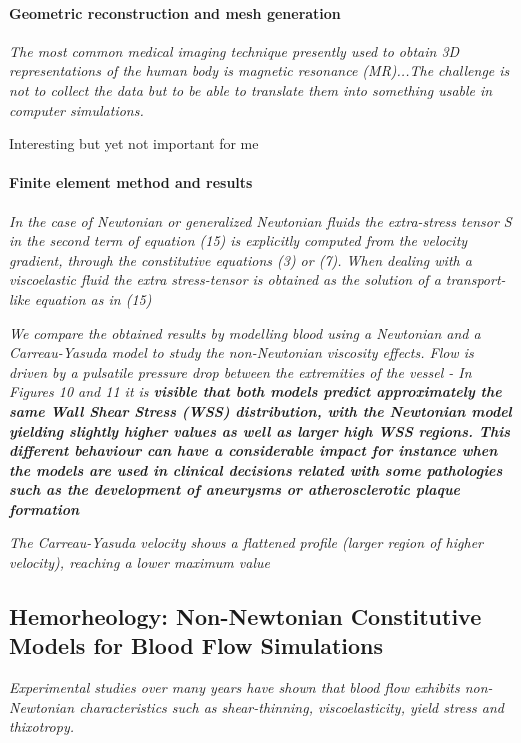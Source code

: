 \documentclass[11pt,letterpaper]{article}
\begin{document}
\paragraph{Geometric reconstruction and mesh generation}
\textit{The most common medical imaging technique presently used to obtain 3D representations of the human body is magnetic resonance (MR)...The challenge is not to collect the data but to be able to translate them into something usable in computer simulations.}

Interesting but yet not important for me


\paragraph{Finite element method and results}

\textit{In the case of Newtonian or generalized Newtonian fluids the extra-stress
tensor S in the second term of equation (15) is explicitly computed from the velocity gradient, through the constitutive equations (3) or (7). When dealing with a viscoelastic fluid the extra stress-tensor is obtained as the solution of a transport-like equation as in (15)}

\textit{We compare the obtained results by modelling blood using a Newtonian and a Carreau-Yasuda model to study the non-Newtonian viscosity effects. Flow is driven by a pulsatile pressure drop between the extremities of the vessel - In Figures 10 and 11 it is \textbf{visible that both models predict approximately
the same Wall Shear Stress (WSS) distribution, with the Newtonian model yielding slightly higher values as well as larger high WSS regions. This different behaviour can have a considerable impact for instance when the models are used in clinical decisions related with some pathologies such as the development of aneurysms or atherosclerotic plaque formation}}

\textit{The Carreau-Yasuda velocity shows a flattened profile (larger region of higher velocity), reaching a lower maximum value}



\newpage
\subsection*{Hemorheology: Non-Newtonian Constitutive Models for Blood Flow Simulations}

\textit{Experimental studies over many years have shown that blood flow exhibits non-Newtonian characteristics such as shear-thinning, viscoelasticity, yield stress and thixotropy.}
\end{document}

